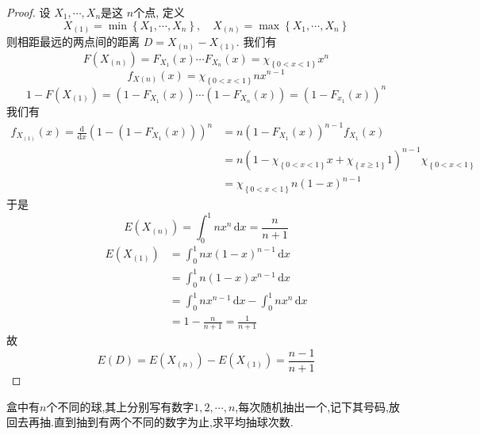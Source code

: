 \documentclass[../main.tex]{subfiles}
\begin{document}
\begin{proof}
  设 \(   X_1,\cdots,X_n   \)是这 \(  n  \)个点, 定义 \[
  X_{\left( 1 \right) }= \min \left\{ X_1,\cdots ,X_{n} \right\},\quad X_{\left( n \right) }= \max \left\{ X_1,\cdots ,X_{n} \right\}
  \]  则相距最远的两点间的距离 \(  D  = X_{\left( n \right) }-X_{\left( 1 \right) }\).  我们有 \[
  F\left( X_{\left( n \right) } \right)= F_{X_1}\left( x \right)\cdots F_{X_{n}}\left( x \right)  = \chi _{\left\{ 0< x< 1 \right\}}x^{n}
  \]  \[
 f_{X\left( n \right) }\left( x \right)= \chi _{\left\{ 0< x< 1 \right\}} nx^{n-1} 
  \] \[
  1-F\left( X_{\left( 1 \right) } \right)= \left( 1-F_{X_1}\left( x \right)   \right)\cdots \left( 1-F_{X_{n}}\left( x \right) \right) = \left( 1- F_{x_1}\left( x \right)   \right)^{n}   
  \]我们有 \[
  \begin{aligned}
  f_{X_{\left( 1 \right) }}\left( x \right)= \frac{\mathrm{d}}{\mathrm{d}x}\left( 1- \left( 1-F_{X_1}\left( x\right)  \right)  \right)^{n} & = n\left( 1-F_{X_1}\left( x \right)  \right)^{n-1}f_{X_1}\left( x \right) \\ 
   &= n\left( 1- \chi _{\left\{ 0< x< 1 \right\}} x+  \chi _{\left\{ x\ge 1 \right\}}1\right)^{n-1}\chi _{\left\{ 0< x< 1 \right\}}   \\ 
    &= \chi _{\left\{ 0< x< 1 \right\}}n\left( 1-x \right)^{n-1} 
  \end{aligned}
  \]于是 \[
  E\left( X_{\left( n \right) } \right)=  \int_{0}^{1}nx^{n}\,\mathrm{d} x= \frac{n }{n+ 1 } 
  \] \[
\begin{aligned}
  E\left( X_{\left( 1 \right) } \right)&= \int_{0}^{1}nx\left( 1-x \right)^{n-1}\,\mathrm{d} x\\ 
   &= \int_{0}^{1}n\left( 1-x \right)x^{n-1}\,\mathrm{d} x\\ 
    &= \int_{0}^{1}nx^{n-1}\,\mathrm{d} x-\int_{0}^{1}nx^{n}\,\mathrm{d} x\\ 
     &=  1-\frac{n }{n+ 1 } = \frac{1 }{n+ 1 } 
\end{aligned}  
  \]故 \[
  E\left( D \right)= E\left( X_{\left( n \right) } \right)-E\left( X_{\left( 1 \right) } \right)= \frac{n-1 }{n+ 1 }    
  \]
\end{proof}

\begin{exercise}{}{}
盒中有\(n\)个不同的球,其上分别写有数字\(1,2,\cdots,n\),每次随机抽出一个,记下其号码,放回去再抽.直到抽到有两个不同的数字为止,求平均抽球次数.
\end{exercise}
\end{document}
